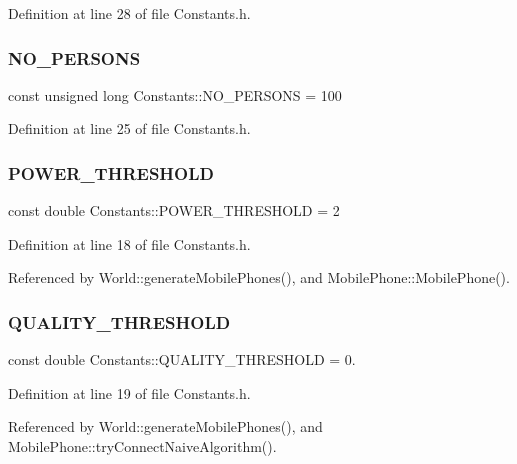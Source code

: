 Definition at line 28 of file Constants.\+h.

\mbox{\label{class_constants_a6dc8cec5cb8a376e136190e445892592}} 
\subsubsection{NO\_PERSONS}
{\footnotesize\ttfamily const unsigned long Constants\+::\+N\+O\+\_\+\+P\+E\+R\+S\+O\+NS = 100\hspace{0.3cm}{\ttfamily [static]}}



Definition at line 25 of file Constants.\+h.

\mbox{\label{class_constants_a472cc73dedd39ce07b18a15b150af418}} 
\subsubsection{POWER\_THRESHOLD}
{\footnotesize\ttfamily const double Constants\+::\+P\+O\+W\+E\+R\+\_\+\+T\+H\+R\+E\+S\+H\+O\+LD = 2\hspace{0.3cm}{\ttfamily [static]}}



Definition at line 18 of file Constants.\+h.



Referenced by World\+::generate\+Mobile\+Phones(), and Mobile\+Phone\+::\+Mobile\+Phone().

\mbox{\label{class_constants_ac1fe084cae6ef71dce35c42a0e36a10a}} 
\subsubsection{QUALITY\_THRESHOLD}
{\footnotesize\ttfamily const double Constants\+::\+Q\+U\+A\+L\+I\+T\+Y\+\_\+\+T\+H\+R\+E\+S\+H\+O\+LD = 0.\hspace{0.3cm}{\ttfamily [static]}}



Definition at line 19 of file Constants.\+h.



Referenced by World\+::generate\+Mobile\+Phones(), and Mobile\+Phone\+::try\+Connect\+Naive\+Algorithm().

